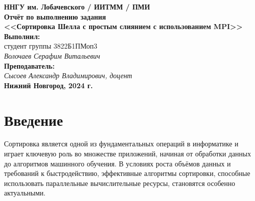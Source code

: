 \documentclass[12pt]{article}
\begin{document}
\begin{titlepage}
    \begin{center}
        \large
        \textbf{ННГУ им. Лобачевского / ИИТММ / ПМИ}\\[0.5cm]

        \vspace{4cm}
        \textbf{\Large Отчёт по выполнению задания}\\
        \textbf{\large <<Сортировка Шелла с простым слиянием с использованием MPI>>}\\[3cm]

        \vspace{3cm}
        \textbf{Выполнил:}\\
        студент группы 3822Б1ПМоп3 \\
        \textit{Волочаев Серафим Витальевич}\\[1cm]

        \textbf{Преподаватель:}\\
        \textit{Сысоев Александр Владимирович, доцент}\\[2cm]

        \vfill
        \textbf{Нижний Новгород, 2024 г.}
    \end{center}
\end{titlepage}

\tableofcontents
\newpage

\section*{Введение}
Сортировка является одной из фундаментальных операций в информатике и играет ключевую роль во множестве приложений, начиная от обработки данных до алгоритмов машинного обучения. В условиях роста объёмов данных и требований к быстродействию, эффективные алгоритмы сортировки, способные использовать параллельные вычислительные ресурсы, становятся особенно актуальными.

\end{document}
